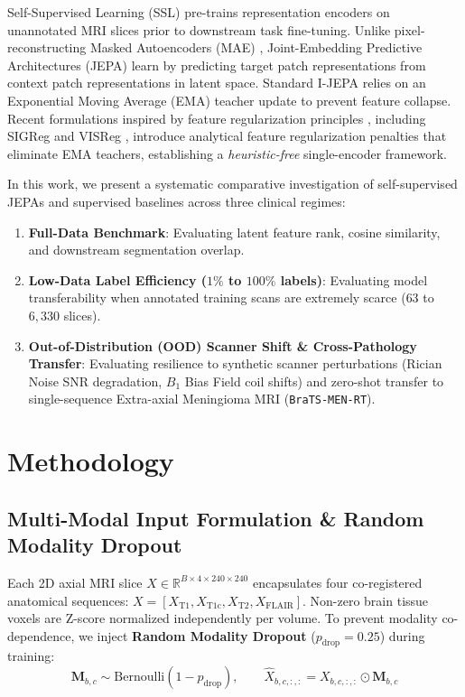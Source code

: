 \documentclass{article}
\begin{document}
Self-Supervised Learning (SSL) pre-trains representation encoders on unannotated MRI slices prior to downstream task fine-tuning. Unlike pixel-reconstructing Masked Autoencoders (MAE) \citep{he2022masked}, Joint-Embedding Predictive Architectures (JEPA) \citep{assran2023ijepa} learn by predicting target patch representations from context patch representations in latent space. Standard I-JEPA relies on an Exponential Moving Average (EMA) teacher update to prevent feature collapse. Recent formulations inspired by feature regularization principles \citep{bardes2021vicreg, zbontar2021barlow}, including SIGReg \citep{balestriero2025lejepa} and VISReg \citep{wu2026visreg}, introduce analytical feature regularization penalties that eliminate EMA teachers, establishing a \emph{heuristic-free} single-encoder framework.

In this work, we present a systematic comparative investigation of self-supervised JEPAs and supervised baselines across three clinical regimes:
\begin{enumerate}
    \item \textbf{Full-Data Benchmark}: Evaluating latent feature rank, cosine similarity, and downstream segmentation overlap.
    \item \textbf{Low-Data Label Efficiency ($1\%$ to $100\%$ labels)}: Evaluating model transferability when annotated training scans are extremely scarce ($63$ to $6,330$ slices).
    \item \textbf{Out-of-Distribution (OOD) Scanner Shift \& Cross-Pathology Transfer}: Evaluating resilience to synthetic scanner perturbations (Rician Noise SNR degradation, $B_1$ Bias Field coil shifts) and zero-shot transfer to single-sequence Extra-axial Meningioma MRI (\texttt{BraTS-MEN-RT}).
\end{enumerate}


\section{Methodology}

\subsection{Multi-Modal Input Formulation \& Random Modality Dropout}
Each 2D axial MRI slice $X \in \mathbb{R}^{B \times 4 \times 240 \times 240}$ encapsulates four co-registered anatomical sequences: $X = [X_{\text{T1}}, X_{\text{T1c}}, X_{\text{T2}}, X_{\text{FLAIR}}]$. Non-zero brain tissue voxels are Z-score normalized independently per volume. To prevent modality co-dependence, we inject \textbf{Random Modality Dropout} ($p_{\text{drop}} = 0.25$) during training:
\begin{equation}
    \mathbf{M}_{b, c} \sim \text{Bernoulli}(1 - p_{\text{drop}}), \qquad \hat{X}_{b, c, :, :} = X_{b, c, :, :} \odot \mathbf{M}_{b, c}
\end{equation}
\end{document}
